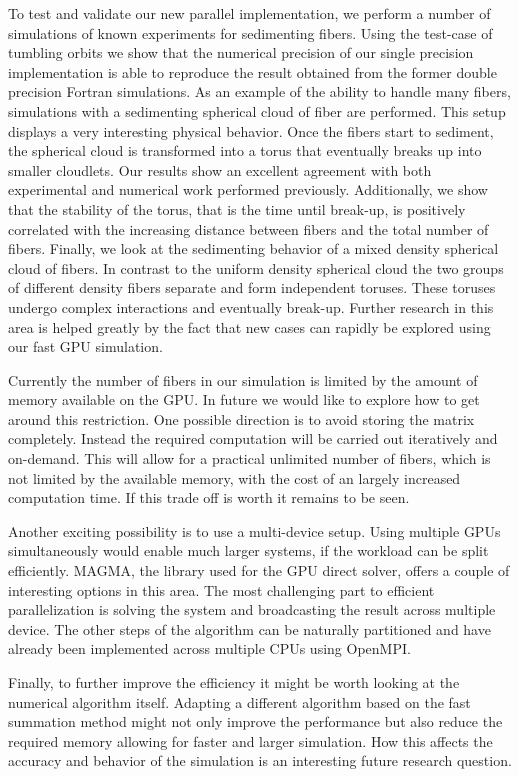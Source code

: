 To test and validate our new parallel implementation, we perform a number of simulations of known experiments for sedimenting fibers. Using the test-case of tumbling orbits we show that the numerical precision of our single precision implementation is able to reproduce the result obtained from the former double precision Fortran simulations. As an example of the ability to handle many fibers, simulations with a sedimenting spherical cloud of fiber are performed. This setup displays a very interesting physical behavior. Once the fibers start to sediment, the spherical cloud is transformed into a torus that eventually breaks up into smaller cloudlets. Our results show an excellent agreement with both experimental and numerical work performed previously. Additionally, we show that the stability of the torus, that is the time until break-up, is positively correlated with the increasing distance between fibers and the total number of fibers. Finally, we look at the sedimenting behavior of a mixed density spherical cloud of fibers. In contrast to the uniform density spherical cloud the two groups of different density fibers separate and form independent toruses. These toruses undergo complex interactions and eventually break-up. Further research in this area is helped greatly by the fact that new cases can rapidly be explored using our fast GPU simulation.

Currently the number of fibers in our simulation is limited by the amount of memory available on the GPU. In future we would like to explore how to get around this restriction. One possible direction is to avoid storing the matrix completely. Instead the required computation will be carried out iteratively and on-demand. This will allow for a practical unlimited number of fibers, which is not limited by the available memory, with the cost of an largely increased computation time. If this trade off is worth it remains to be seen.

Another exciting possibility is to use a multi-device setup. Using multiple GPUs simultaneously would enable much larger systems, if the workload can be split efficiently. MAGMA, the library used for the GPU direct solver, offers a couple of interesting options in this area. The most challenging part to efficient parallelization is solving the system and broadcasting the result across multiple device. The other steps of the algorithm can be naturally partitioned and have already been implemented across multiple CPUs using OpenMPI.\enlargethispage{\baselineskip}

Finally, to further improve the efficiency it might be worth looking at the numerical algorithm itself. Adapting a different algorithm based on the fast summation method might not only improve the performance but also reduce the required memory allowing for faster and larger simulation. How this affects the accuracy and behavior of the simulation is an interesting future research question.
